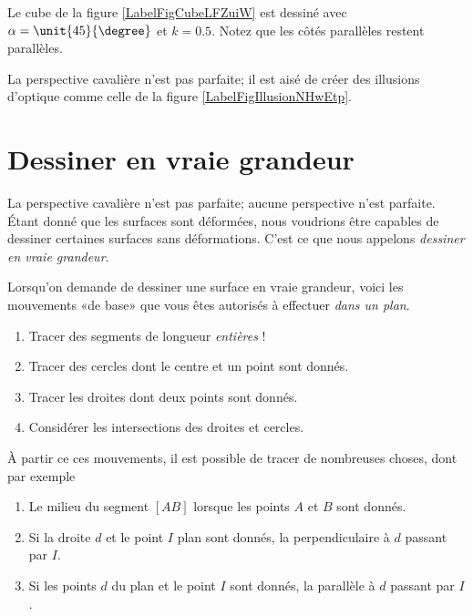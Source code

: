 Le cube de la figure \ref{LabelFigCubeLFZuiW} est dessiné avec \( \alpha=\unit{45}{\degree}\) et \( k=0.5\). Notez que les côtés parallèles restent parallèles.
\newcommand{\CaptionFigCubeLFZuiW}{Les segments perpendiculaires à la feuille sont de longueur moitié des autres.}


La perspective cavalière n'est pas parfaite; il est aisé de créer des illusions d'optique comme celle de la figure \ref{LabelFigIllusionNHwEtp}. %
\newcommand{\CaptionFigIllusionNHwEtp}{Une petite illusion d'optique facile.}


\section{Dessiner en vraie grandeur}

La perspective cavalière n'est pas parfaite; aucune perspective n'est parfaite. Étant donné que les surfaces sont déformées, nous voudrions être capables de dessiner certaines surfaces sans déformations. C'est ce que nous appelons \emph{dessiner en vraie grandeur}.


\begin{Aretenir}
    Lorsqu'on demande de dessiner une surface en vraie grandeur, voici les mouvements «de base» que vous êtes autorisés à effectuer \emph{dans un plan}.
    \begin{enumerate}
        \item
            Tracer des segments de longueur \emph{entières} !
        \item
            Tracer des cercles dont le centre et un point sont donnés.
        \item
            Tracer les droites dont deux points sont donnés.
        \item
            Considérer les intersections des droites et cercles.
    \end{enumerate}
    À partir ce ces mouvements, il est possible de tracer de nombreuses choses, dont par exemple
    \begin{enumerate}
        \item
            Le milieu du segment \( [AB]\) lorsque les points \( A\) et \( B\) sont donnés.
        \item
            Si la droite \( d\) et le point \( I\) plan sont donnés, la perpendiculaire à \( d\) passant par \( I\).
        \item
            Si les points \( d\) du plan et le point \( I\) sont donnés, la parallèle à \( d\) passant par \( I\).
    \end{enumerate}
\end{Aretenir}

